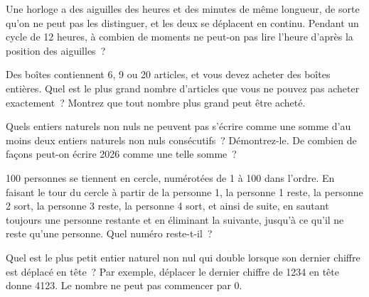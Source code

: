 \begin{question}\label{iq:iv1:number-riddles:19}
Une horloge a des aiguilles des heures et des minutes de même longueur, de sorte qu'on ne peut pas les distinguer, et les deux se déplacent en continu. Pendant un cycle de 12 heures, à combien de moments ne peut-on pas lire l'heure d'après la position des aiguilles~?
\end{question}

\begin{question}\label{iq:iv1:number-riddles:20}
Des boîtes contiennent 6, 9 ou 20 articles, et vous devez acheter des boîtes entières. Quel est le plus grand nombre d'articles que vous ne pouvez pas acheter exactement~? Montrez que tout nombre plus grand peut être acheté.
\end{question}

\begin{question}\label{iq:iv1:number-riddles:21}
Quels entiers naturels non nuls ne peuvent pas s'écrire comme une somme d'au moins deux entiers naturels non nuls consécutifs~? Démontrez-le. De combien de façons peut-on écrire 2026 comme une telle somme~?
\end{question}

\begin{question}\label{iq:iv1:number-riddles:22}
100 personnes se tiennent en cercle, numérotées de 1 à 100 dans l'ordre. En faisant le tour du cercle à partir de la personne 1, la personne 1 reste, la personne 2 sort, la personne 3 reste, la personne 4 sort, et ainsi de suite, en sautant toujours une personne restante et en éliminant la suivante, jusqu'à ce qu'il ne reste qu'une personne. Quel numéro reste-t-il~?
\end{question}

\begin{question}\label{iq:iv1:number-riddles:23}
Quel est le plus petit entier naturel non nul qui double lorsque son dernier chiffre est déplacé en tête~? Par exemple, déplacer le dernier chiffre de 1234 en tête donne 4123. Le nombre ne peut pas commencer par 0.
\end{question}

